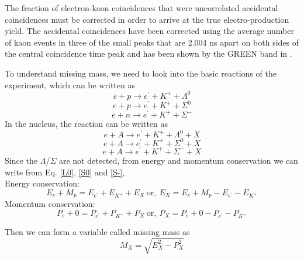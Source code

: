 The fraction of electron-kaon coincidences that were uncorrelated accidental coincidences must be corrected in order to arrive at the true electro-production yield. The accidental coincidences have been corrected using the average number of kaon events in three of the small peaks that are 2.004 ns apart on both sides of the central coincidence time peak and has been shown by the GREEN band in .

%
\label{Missing Mass}
To understand missing mass, we need to look into the basic reactions of the experiment, which can 
be written as
\begin{equation}
\label{L0}
e + p \rightarrow e^\prime + K^+ + \Lambda^0
\end{equation}
\begin{equation}
\label{S0}
e + p \rightarrow e^\prime + K^+ + \Sigma^0
\end{equation}
\begin{equation}
\label{S-}
e + n \rightarrow e^\prime + K^+ + \Sigma^-
\end{equation}
In the nucleus, the reaction can be written as
\begin{equation}
e + A \rightarrow e^\prime + K^+ + \Lambda^0 + X
\end{equation}
\begin{equation}
e + A \rightarrow e^\prime + K^+ + \Sigma^0 + X
\end{equation}
\begin{equation}
e + A \rightarrow e^\prime + K^+ + \Sigma^- + X
\end{equation}
Since the $\Lambda$/$\Sigma$ are not detected, from energy and momentum conservation we can write from Eq. \ref{L0}, \ref{S0} and \ref{S-},\\
Energy conservation: 
\begin{equation}
E_e + M_p = E_{e^\prime} + E_{K^+} + E_X ~\mathrm{or,}~ E_X = E_e + M_p - E_{e^\prime} - E_{K^+}
\end{equation}
Momentum conservation:
\begin{equation}
P_e + 0 = P_{e^\prime} + P_{K^+} + P_X ~\mathrm{or,}~ P_X = P_e + 0 - P_{e^\prime} - P_{K^+}
\end{equation}

Then we can form a variable called missing mass as 
\begin{equation}
M_X =  \sqrt{E_X^2 - P_X^2 }
\end{equation}

